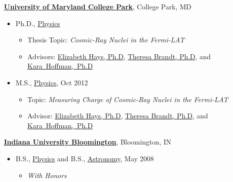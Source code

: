 \documentclass[10pt]{article}
\newenvironment{outerlist}[1][\enskip\textbullet]%
        {\begin{itemize}[#1,leftmargin=*]}{\end{itemize}%
         \vspace{-.6\baselineskip}}
\newenvironment{innerlist}[1][\enskip\textbullet]%
        {\begin{itemize}[#1,leftmargin=*,parsep=0pt,itemsep=0pt,topsep=0pt,partopsep=0pt]}
        {\end{itemize}}
\begin{document}
\href{http://umdphysics.umd.edu/}{\textbf{University of Maryland College Park}},
College Park, MD
\begin{outerlist}

\item[] Ph.D.,
        \href{http://umdphysics.umd.edu/}
             {Physics}
        \begin{innerlist}
        \item Thesis Topic: \emph{Cosmic-Ray Nuclei in the Fermi-LAT}
        \item Advisors:
              \href{http://science.gsfc.nasa.gov/sed/index.cfm?fuseAction=people.jumpBio&iphonebookid=17930}
                   {Elizabeth Hays, Ph.D},
              \href{http://science.gsfc.nasa.gov/sed/index.cfm?fuseAction=people.jumpBio&&iPhonebookId=30165}
                   {Theresa Brandt, Ph.D}, and
            \mbox{\href{http://www.umdphysics.umd.edu/index.php/about-us/people/faculty/151-hoffman.html}
                   {Kara Hoffman, Ph.D} }
        \end{innerlist}

\item[] M.S.,
        \href{http://umdphysics.umd.edu/}
             {Physics},
             Oct 2012
        \begin{innerlist}
        \item Topic: \emph{Measuring Charge of Cosmic-Ray Nuclei in the Fermi-LAT}
        \item Advisor:
              \href{http://science.gsfc.nasa.gov/sed/index.cfm?fuseAction=people.jumpBio&iphonebookid=17930}
                   {Elizabeth Hays, Ph.D},
              \href{http://science.gsfc.nasa.gov/sed/index.cfm?fuseAction=people.jumpBio&&iPhonebookId=30165}
                   {Theresa Brandt, Ph.D}, and
            \mbox{\href{http://www.umdphysics.umd.edu/index.php/about-us/people/faculty/151-hoffman.html}
                   {Kara Hoffman, Ph.D} }
        \end{innerlist}
\end{outerlist}
\vspace{.1in}
\href{http://www.iub.edu/~iubphys/}{\textbf{Indiana University Bloomington}},
Bloomington, IN
\begin{outerlist}
\item[] B.S.,
        \href{http://www.iub.edu/~iubphys/}
             {Physics} and     B.S.,  \href{http://www.astro.indiana.edu/}{Astronomy}, May 2008
        \begin{innerlist}
        \item \emph{With Honors}
        \end{innerlist}

\end{outerlist}
\end{document}
